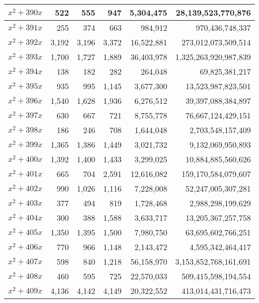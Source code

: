 \documentclass[a4paper]{amsproc}
\theoremstyle{plain}
\begin{document}
\begin{longtable}{ | l | r | r | r | r | r | }
$x^2 + 390x$ & 522 & 555 & 947 & 5{,}304{,}475 & 28{,}139{,}523{,}770{,}876 \\ \hline
$x^2 + 391x$ & 255 & 374 & 663 & 984{,}912 & 970{,}436{,}748{,}337 \\ \hline
$x^2 + 392x$ & 3{,}192 & 3{,}196 & 3{,}372 & 16{,}522{,}881 & 273{,}012{,}073{,}509{,}514 \\ \hline
$x^2 + 393x$ & 1{,}700 & 1{,}727 & 1{,}889 & 36{,}403{,}978 & 1{,}325{,}263{,}920{,}987{,}839 \\ \hline
$x^2 + 394x$ & 138 & 182 & 282 & 264{,}048 & 69{,}825{,}381{,}217 \\ \hline
$x^2 + 395x$ & 935 & 995 & 1{,}145 & 3{,}677{,}300 & 13{,}523{,}987{,}823{,}501 \\ \hline
$x^2 + 396x$ & 1{,}540 & 1{,}628 & 1{,}936 & 6{,}276{,}512 & 39{,}397{,}088{,}384{,}897 \\ \hline
$x^2 + 397x$ & 630 & 667 & 721 & 8{,}755{,}778 & 76{,}667{,}124{,}429{,}151 \\ \hline
$x^2 + 398x$ & 186 & 246 & 708 & 1{,}644{,}048 & 2{,}703{,}548{,}157{,}409 \\ \hline
$x^2 + 399x$ & 1{,}365 & 1{,}386 & 1{,}449 & 3{,}021{,}732 & 9{,}132{,}069{,}950{,}893 \\ \hline
$x^2 + 400x$ & 1{,}392 & 1{,}400 & 1{,}433 & 3{,}299{,}025 & 10{,}884{,}885{,}560{,}626 \\ \hline
$x^2 + 401x$ & 665 & 704 & 2{,}591 & 12{,}616{,}082 & 159{,}170{,}584{,}079{,}607 \\ \hline
$x^2 + 402x$ & 990 & 1{,}026 & 1{,}116 & 7{,}228{,}008 & 52{,}247{,}005{,}307{,}281 \\ \hline
$x^2 + 403x$ & 377 & 494 & 819 & 1{,}728{,}468 & 2{,}988{,}298{,}199{,}629 \\ \hline
$x^2 + 404x$ & 300 & 388 & 1{,}588 & 3{,}633{,}717 & 13{,}205{,}367{,}257{,}758 \\ \hline
$x^2 + 405x$ & 1{,}350 & 1{,}395 & 1{,}500 & 7{,}980{,}750 & 63{,}695{,}602{,}766{,}251 \\ \hline
$x^2 + 406x$ & 770 & 966 & 1{,}148 & 2{,}143{,}472 & 4{,}595{,}342{,}464{,}417 \\ \hline
$x^2 + 407x$ & 598 & 840 & 1{,}218 & 56{,}158{,}970 & 3{,}153{,}852{,}768{,}161{,}691 \\ \hline
$x^2 + 408x$ & 460 & 595 & 725 & 22{,}570{,}033 & 509{,}415{,}598{,}194{,}554 \\ \hline
$x^2 + 409x$ & 4{,}136 & 4{,}142 & 4{,}149 & 20{,}322{,}552 & 413{,}014{,}431{,}716{,}473 \\ \hline

\end{longtable}
\end{document}
